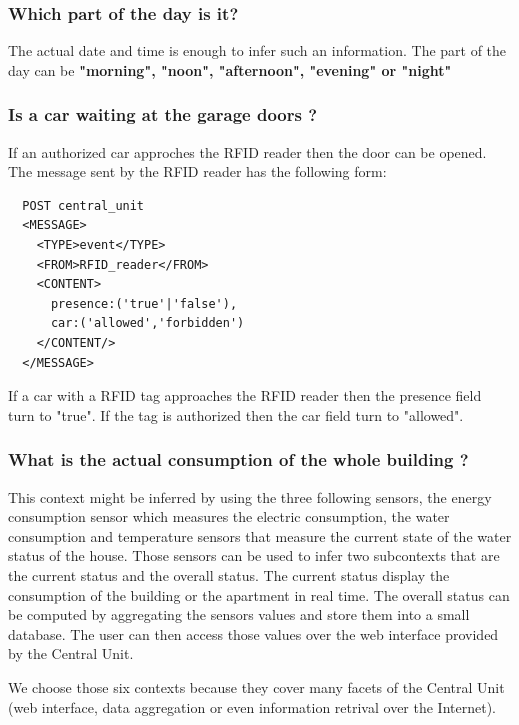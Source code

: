 \documentclass{acm_proc_article-sp}
\begin{document}
  \subsubsection*{Which part of the day is it?}
  The actual date and time is enough to infer such an information.
  The part of the day can be \textbf{"morning", "noon", "afternoon", "evening" or "night"}
 \subsubsection*{Is a car waiting at the garage doors ?}
 If an authorized car approches the RFID reader then the door can be opened.
 The message sent by the RFID reader has the following form:
  \begin{verbatim}
  POST central_unit 
  <MESSAGE>
    <TYPE>event</TYPE>
    <FROM>RFID_reader</FROM>
    <CONTENT>
      presence:('true'|'false'),
      car:('allowed','forbidden')
    </CONTENT/>
  </MESSAGE> 
\end{verbatim}
If a car with a RFID tag approaches the RFID reader then the presence field turn to "true". If the tag is authorized then the car field turn to "allowed".
 \subsubsection*{What is the actual consumption of the whole building ?}
 This context might be inferred by using the three following sensors, the energy consumption sensor which measures the electric consumption, 
 the water consumption and temperature sensors that measure the current state of the water status of the house.
 Those sensors can be used to infer two subcontexts that are the current status and the overall status.
 The current status display the consumption of the building or the apartment in real time.
 The overall status can be computed by aggregating the sensors values and store them into a small database.
 The user can then access those values over the web interface provided by the Central Unit.

We choose those six contexts because they cover many facets of the Central Unit (web interface, data aggregation or even information retrival over the Internet).
\end{document}
